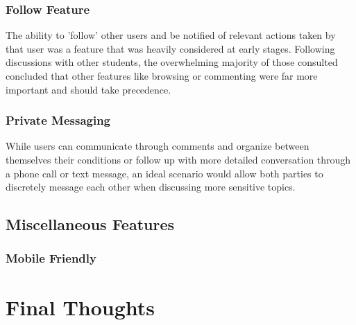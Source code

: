 \subsubsection{Follow Feature}
The ability to 'follow' other users and be notified of relevant actions taken by that user was a feature that was heavily considered at early stages. Following discussions with other students, the overwhelming majority of those consulted concluded that other features like browsing or commenting were far more important and should take precedence.

\subsubsection{Private Messaging}
While users can communicate through comments and organize between themselves their conditions or follow up with more detailed conversation through a phone call or text message, an ideal scenario would allow both parties to discretely message each other when discussing more sensitive topics.

\subsection{Miscellaneous Features}

\subsubsection{Mobile Friendly}

\subsubsection{}

\section{Final Thoughts}